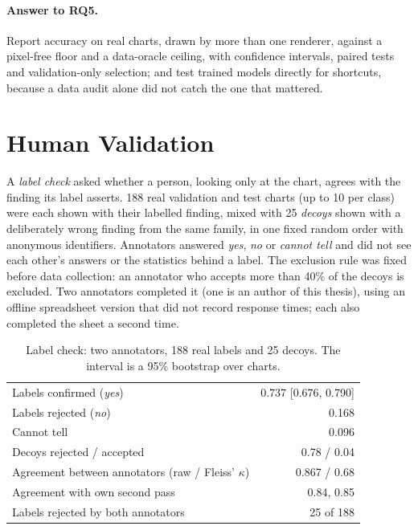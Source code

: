 \paragraph{Answer to RQ5.} Report accuracy on real charts, drawn by more than one
renderer, against a pixel-free floor and a data-oracle ceiling, with confidence
intervals, paired tests and validation-only selection; and test trained models directly
for shortcuts, because a data audit alone did not catch the one that mattered.

\section{Human Validation}
\label{sec:human}

A \emph{label check} asked whether a person, looking only at the chart, agrees with the
finding its label asserts. 188 real validation and test charts (up to 10 per class) were
each shown with their labelled finding, mixed with 25 \emph{decoys} shown with a
deliberately wrong finding from the same family, in one fixed random order with anonymous
identifiers. Annotators answered \emph{yes}, \emph{no} or \emph{cannot tell} and did not
see each other's answers or the statistics behind a label. The exclusion rule was fixed
before data collection: an annotator who accepts more than 40\% of the decoys is excluded.
Two annotators completed it (one is an author of this thesis), using an offline spreadsheet
version that did not record response times; each also completed the sheet a second time.

\begin{table}[h]\centering\small
\caption{Label check: two annotators, 188 real labels and 25 decoys. The interval is a 95\%
bootstrap over charts.}
\label{tab:labelcheck}
\begin{tabular}{lr}
\toprule
Labels confirmed (\emph{yes}) & 0.737 [0.676, 0.790] \\
Labels rejected (\emph{no}) & 0.168 \\
Cannot tell & 0.096 \\
Decoys rejected / accepted & 0.78 / 0.04 \\
Agreement between annotators (raw / Fleiss' $\kappa$) & 0.867 / 0.68 \\
Agreement with own second pass & 0.84, 0.85 \\
Labels rejected by both annotators & 25 of 188 \\
\bottomrule
\end{tabular}
\end{table}

